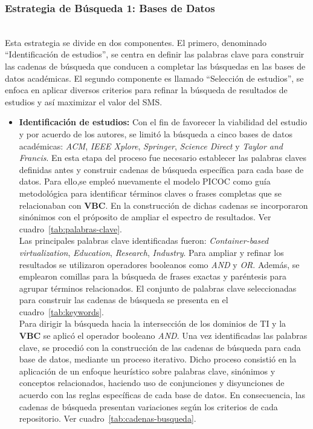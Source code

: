 \subsubsection{Estrategia de Búsqueda 1: Bases de Datos}
\mbox{}\\
Esta estrategia se divide en dos componentes. El primero, denominado ``Identificación de estudios'', se centra en definir las palabras clave para construir las cadenas de búsqueda que conducen a completar las búsquedas en las bases de datos académicas.
El segundo componente es llamado ``Selección de estudios'', se enfoca en aplicar diversos criterios para refinar la búsqueda de resultados de estudios y así maximizar el valor del SMS.

\begin{itemize}
    \item \textbf{Identificación de estudios: } Con el fin de favorecer la viabilidad del estudio y por acuerdo de los autores, se limitó la búsqueda a cinco bases de datos académicas: \textit{ACM}, \textit{IEEE Xplore}, \textit{Springer}, \textit{Science Direct} y \textit{Taylor and Francis}. En esta etapa del proceso fue necesario establecer las palabras claves definidas antes y construir cadenas de búsqueda específica para cada base de datos. Para ello,se empleó nuevamente el modelo PICOC como guía metodológica para identificar términos claves o frases completas que se relacionaban con \textbf{VBC}. En la construcción de dichas cadenas se incorporaron sinónimos con el próposito de ampliar el espectro de resultados. Ver cuadro~\ref{tab:palabras-clave}.\\
    Las principales palabras clave identificadas fueron: \textit{Container-based virtualization}, \textit{Education}, \textit{Research}, \textit{Industry}. Para ampliar y refinar los resultados se utilizaron operadores booleanos como \textit{AND} y \textit{OR}. Además, se emplearon comillas para la búsqueda de frases exactas y paréntesis para agrupar términos relacionados. El conjunto de palabras clave seleccionadas para construir las cadenas de búsqueda se presenta en el cuadro~\ref{tab:keywords}.\\
    Para dirigir la búsqueda hacia la intersección de los dominios de TI y la \textbf{VBC} se aplicó el operador booleano \textit{AND}. Una vez identificadas las palabras clave, se procedió con la construcción de las cadenas de búsqueda para cada base de datos, mediante un proceso iterativo. Dicho proceso consistió en la aplicación de un enfoque heurístico sobre palabras clave, sinónimos y conceptos relacionados, haciendo uso de conjunciones y disyunciones de acuerdo con las reglas específicas de cada base de datos. En consecuencia, las cadenas de búsqueda presentan variaciones según los criterios de cada repositorio. Ver cuadro~\ref{tab:cadenas-busqueda}.\\


\end{itemize}
